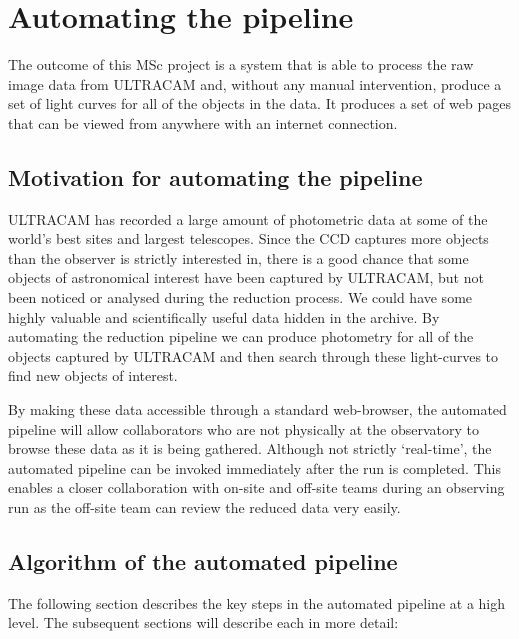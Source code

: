 \section{Automating the pipeline}
The outcome of this MSc project is a system that is able to process the raw image data from ULTRACAM and, without any manual intervention, produce a set of light curves for all of the objects in the data. It produces a set of web pages that can be viewed from anywhere with an internet connection. 

\subsection{Motivation for automating the pipeline}
ULTRACAM has recorded a large amount of photometric data at some of the world's best sites and largest telescopes. Since the CCD captures more objects than the observer is strictly interested in, there is a good chance that some objects of astronomical interest have been captured by ULTRACAM, but not been noticed or analysed during the reduction process. We could have some highly valuable and scientifically useful data hidden in the archive. By automating the reduction pipeline we can produce photometry for all of the objects captured by ULTRACAM and then search through these light-curves to find new objects of interest. 

By making these data accessible through a standard web-browser, the automated pipeline will allow collaborators who are not physically at the observatory to browse these data as it is being gathered. Although not strictly `real-time', the automated pipeline can be invoked immediately after the run is completed.  This enables a closer collaboration with on-site and off-site teams during an observing run as the off-site team can review the reduced data very easily.

\subsection{Algorithm of the automated pipeline} 
The following section describes the key steps in the automated pipeline at a high level. The subsequent sections will describe each in more detail:

